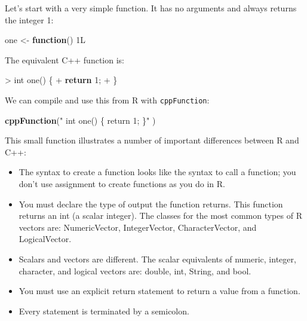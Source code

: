 \documentclass[]{krantz}
\makeatletter
\newenvironment{Shaded}{\begin{snugshade}}{\end{snugshade}}
\newcommand{\KeywordTok}[1]{\textcolor[rgb]{0.27,0.27,0.27}{\textbf{#1}}}
\newcommand{\DataTypeTok}[1]{\textcolor[rgb]{0.27,0.27,0.27}{#1}}
\newcommand{\DecValTok}[1]{\textcolor[rgb]{0.06,0.06,0.06}{#1}}
\newcommand{\StringTok}[1]{\textcolor[rgb]{0.5,0.5,0.5}{#1}}
\newcommand{\ControlFlowTok}[1]{\textcolor[rgb]{0.27,0.27,0.27}{\textbf{#1}}}
\newcommand{\NormalTok}[1]{#1}
\providecommand{\tightlist}{%
  \setlength{\itemsep}{0pt}\setlength{\parskip}{0pt}}
\newenvironment{kframe}{%
\medskip{}
\setlength{\fboxsep}{.8em}
 \def\at@end@of@kframe{}%
 \ifinner\ifhmode%
  \def\at@end@of@kframe{\end{minipage}}%
  \begin{minipage}{\columnwidth}%
 \fi\fi%
 \def\FrameCommand##1{\hskip\@totalleftmargin \hskip-\fboxsep
 \colorbox{shadecolor}{##1}\hskip-\fboxsep
     \hskip-\linewidth \hskip-\@totalleftmargin \hskip\columnwidth}%
 \MakeFramed {\advance\hsize-\width
   \@totalleftmargin\z@ \linewidth\hsize
   \@setminipage}}%
 {\par\unskip\endMakeFramed%
 \at@end@of@kframe}
\renewenvironment{Shaded}{\begin{kframe}}{\end{kframe}}
\makeatother
\begin{document}
Let's start with a very simple function. It has no arguments and always
returns the integer 1:

\begin{Shaded}
\begin{Highlighting}[]
\NormalTok{one <-}\StringTok{ }\ControlFlowTok{function}\NormalTok{() 1L}
\end{Highlighting}
\end{Shaded}

The equivalent C++ function is:

\begin{Shaded}
\begin{Highlighting}[]
\NormalTok{> }\DataTypeTok{int}\NormalTok{ one() \{}
\NormalTok{+   }\ControlFlowTok{return} \DecValTok{1}\NormalTok{;}
\NormalTok{+ \}}
\end{Highlighting}
\end{Shaded}

We can compile and use this from R with \texttt{cppFunction}:

\begin{Shaded}
\begin{Highlighting}[]
\KeywordTok{cppFunction}\NormalTok{(}\StringTok{"}
\StringTok{  int one() \{}
\StringTok{    return 1;}
\StringTok{  \}"}
\NormalTok{)}
\end{Highlighting}
\end{Shaded}

This small function illustrates a number of important differences
between R and C++:

\begin{itemize}
\tightlist
\item
  The syntax to create a function looks like the syntax to call a
  function; you don't use assignment to create functions as you do in R.
\item
  You must declare the type of output the function returns. This
  function returns an int (a scalar integer). The classes for the most
  common types of R vectors are: NumericVector, IntegerVector,
  CharacterVector, and LogicalVector.
\item
  Scalars and vectors are different. The scalar equivalents of numeric,
  integer, character, and logical vectors are: double, int, String, and
  bool.
\item
  You must use an explicit return statement to return a value from a
  function.
\item
  Every statement is terminated by a semicolon.
\end{itemize}
\end{document}
